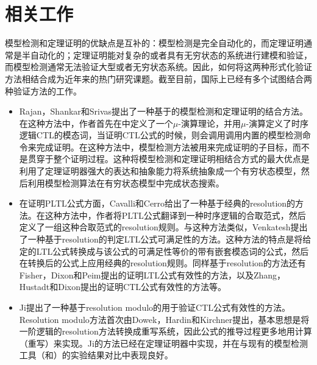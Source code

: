 \section{相关工作}
模型检测和定理证明的优缺点是互补的：模型检测是完全自动化的，而定理证明通常是半自动化的；定理证明能对复杂的或者具有无穷状态的系统进行建模和验证，而模型检测通常无法验证大型或者无穷状态系统。因此，如何将这两种形式化验证方法相结合成为近年来的热门研究课题。截至目前，国际上已经有多个试图结合两种验证方法的工作。
\begin{itemize}
	\item Rajan，Shankar和Srivas提出了一种基于的模型检测和定理证明的结合方法\cite{RajanSS95}。在这种方法中，作者首先在中定义了一个$\mu$-演算理论，并用$\mu$-演算定义了时序逻辑\textsf{CTL}的模态词，当证明\textsf{CTL}公式的时候，则会调用调用内置的模型检测命令来完成证明。在这种方法中，模型检测方法被用来完成证明的子目标，而不是贯穿于整个证明过程。这种将模型检测和定理证明相结合方式的最大优点是利用了定理证明器强大的表达和抽象能力将系统抽象成一个有穷状态模型，然后利用模型检测算法在有穷状态模型中完成状态搜索。
	\item 在证明\textsf{PLTL}公式方面，Cavalli和Cerro给出了一种基于经典的resolution的方法\cite{CavalliC84}。在这种方法中，作者将\textsf{PLTL}公式翻译到一种时序逻辑的合取范式，然后定义了一组这种合取范式的resolution规则。与这种方法类似，Venkatesh提出了一种基于resolution的判定\textsf{LTL}公式可满足性的方法\cite{Venkatesh85}。这种方法的特点是将给定的\textsf{LTL}公式转换成与该公式的可满足性等价的带有嵌套模态词的公式，然后在转换后的公式上应用经典的resolution规则。同样基于resolution的方法还有Fisher，Dixon和Peim提出的证明\textsf{LTL}公式有效性的方法\cite{FisherDP01}，以及Zhang，Hustadt和Dixon提出的证明\textsf{CTL}公式有效性的方法\cite{ZhangHD14}等。
	\item Ji提出了一种基于resolution modulo的用于验证\textsf{CTL}公式有效性的方法\cite{Ji15}。Resolution modulo方法首次由Dowek，Hardin和Kirchner提出\cite{DowekHK03,Dowek10}，基本思想是将一阶逻辑的resolution方法转换成重写系统，因此公式的推导过程更多地用计算（重写）来实现。Ji的方法已经在定理证明器中实现，并在与现有的模型检测工具（\nusmv{}和\verds{}）的实验结果对比中表现良好。
\end{itemize}
